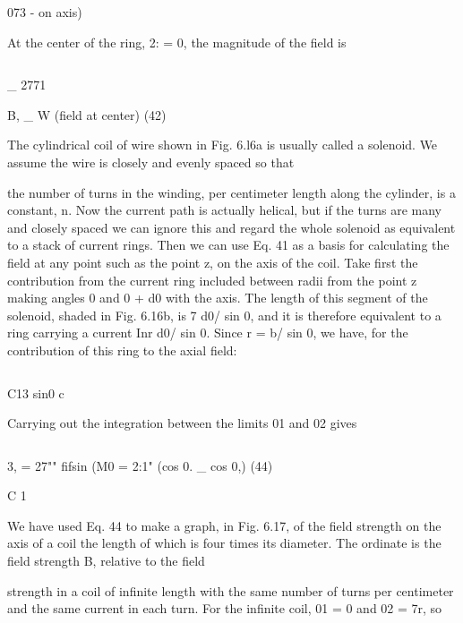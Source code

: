 073 -    on axis) 

At the center of the ring, 2: = 0, the magnitude of the field is

\begin{equation}
\end{equation}

_ 2771

B, _ W (field at center) (42)

The cylindrical coil of wire shown in Fig. 6.l6a is usually called a
solenoid. We assume the wire is closely and evenly spaced so that

the number of turns in the winding, per centimeter length along the
cylinder, is a constant, n. Now the current path is actually helical,
but if the turns are many and closely spaced we can ignore this and
regard the whole solenoid as equivalent to a stack of current rings.
Then we can use Eq. 41 as a basis for calculating the field at any point
such as the point z, on the axis of the coil. Take first the contribution
from the current ring included between radii from the point z making
angles 0 and 0 + d0 with the axis. The length of this segment of the
solenoid, shaded in Fig. 6.16b, is 7 d0/ sin 0, and it is therefore equivalent
to a ring carrying a current Inr d0/ sin 0. Since r = b/ sin 0, we
have, for the contribution of this ring to the axial field:

\begin{equation}
\end{equation}

C13 sin0 c

Carrying out the integration between the limits 01 and 02 gives

\begin{equation}
\end{equation}

3, = 27"" fifsin (M0 = 2:1" (cos 0. _ cos 0,) (44)

C 1

We have used Eq. 44 to make a graph, in Fig. 6.17, of the field
strength on the axis of a coil the length of which is four times its
diameter. The ordinate is the field strength B, relative to the field

 

strength in a coil of infinite length with the same number of turns
per centimeter and the same current in each turn. For the infinite
coil, 01 = 0 and 02 = 7r, so

\begin{equation}
\end{equation}

